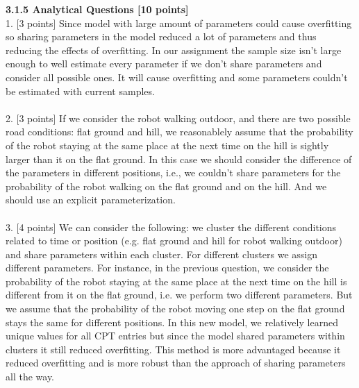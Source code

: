 \documentclass[a4paper]{article}
\begin{document}
\noindent \large \textbf{3.1.5 Analytical Questions [10 points]}\\
1. [3 points] 
Since model with large amount of parameters could cause overfitting so sharing parameters in the model reduced a lot of parameters and thus reducing the effects of overfitting. In our assignment the sample size isn't large enough to well estimate every parameter if we don't share parameters and consider all possible ones. It will cause overfitting and some parameters couldn't be estimated with current samples.\\
\\
2. [3 points]
If we consider the robot walking outdoor, and there are two possible road conditions: flat ground and hill, we reasonablely assume that the probability of  the robot staying at the same place at the next time on the hill is sightly larger than it on the flat ground. In this case we should consider the difference of the parameters in different positions, i.e., we couldn't share parameters for the probability of the robot walking on the flat ground and on the hill. And we should use an explicit parameterization.\\
\\
3. [4 points]
We can consider the following: we cluster the different conditions related to time or position (e.g. flat ground and hill for robot walking outdoor) and share parameters within each cluster. For different clusters we assign different parameters. For instance, in the previous question, we consider the probability of the robot staying at the same place at the next time on the hill is different from it on the flat ground, i.e. we perform two different parameters. But we assume that the probability of the robot moving one step on the flat ground stays the same for different positions. In this new model, we relatively learned unique values for all CPT entries but since the model shared parameters within clusters it still reduced overfitting. This method is more advantaged because it reduced overfitting and is more robust than the approach of sharing parameters all the way.\\
\end{document}
